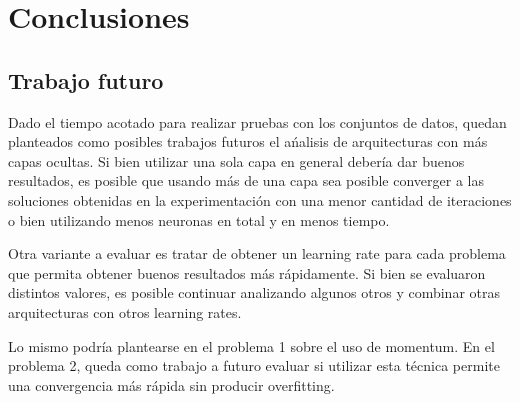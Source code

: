 \documentclass[informe.tex]{subfiles}
\begin{document}
  
  \section{Conclusiones}
  
  
    \subsection{Trabajo futuro}
    
      Dado el tiempo acotado para realizar pruebas con los conjuntos de datos, quedan planteados como posibles trabajos futuros el ańalisis de arquitecturas con más capas ocultas. Si bien utilizar una sola capa en general debería dar buenos resultados, es posible que usando más de una capa sea posible converger a las soluciones obtenidas en la experimentación con una menor cantidad de iteraciones o bien utilizando menos neuronas en total y en menos tiempo.
      
      Otra variante a evaluar es tratar de obtener un learning rate para cada problema que permita obtener buenos resultados m\'as r\'apidamente. Si bien se evaluaron distintos valores, es posible continuar analizando algunos otros y combinar otras arquitecturas con otros learning rates.
      
      Lo mismo podría plantearse en el problema 1 sobre el uso de momentum. En el problema 2, queda como trabajo a futuro evaluar si utilizar esta técnica permite una convergencia más rápida sin producir overfitting.
\end{document}
